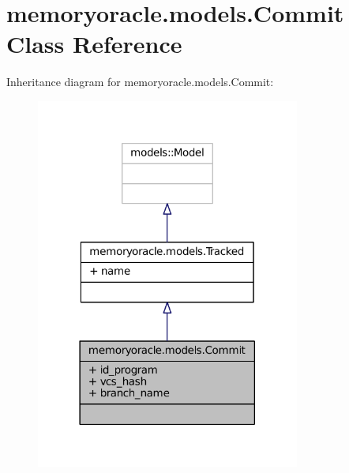 \hypertarget{classmemoryoracle_1_1models_1_1Commit}{}\section{memoryoracle.\+models.\+Commit Class Reference}
\label{classmemoryoracle_1_1models_1_1Commit}


Inheritance diagram for memoryoracle.\+models.\+Commit\+:\nopagebreak
\begin{figure}[H]
\begin{center}
\leavevmode
\includegraphics[width=246pt]{classmemoryoracle_1_1models_1_1Commit__inherit__graph}
\end{center}
\end{figure}


